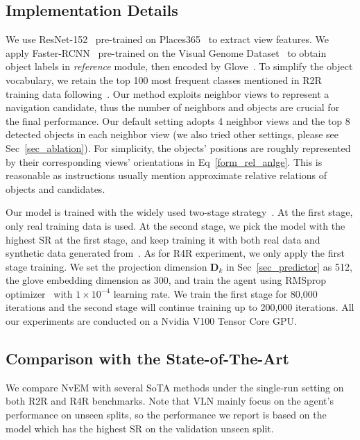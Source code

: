 \documentclass[sigconf]{acmart}
\begin{document}
\subsection{Implementation Details}
We use ResNet-152~\cite{he2016resnet} pre-trained on Places365~\cite{zhou2018places} to extract view features. 
We apply Faster-RCNN~\cite{ren2015faster-rcnn} pre-trained on the Visual Genome Dataset~\cite{ranjay2017genome} to obtain object labels in \textit{reference} module, then encoded by Glove~\cite{jeffrey2014glove}. 
To simplify the object vocabulary, we retain the top 100 most frequent classes mentioned in R2R training data following~\cite{hong2020relgraph}. 
Our method exploits neighbor views to represent a navigation candidate, thus the number of neighbors and objects are crucial for the final performance. 
Our default setting adopts 4 neighbor views and the top 8 detected objects in each neighbor view (we also tried other settings, please see Sec~\ref{sec_ablation}).
For simplicity, the objects' positions are roughly represented by their corresponding views' orientations in Eq~\eqref{form_rel_anlge}. This is reasonable as instructions usually mention approximate relative relations of objects and candidates. 

Our model is trained with the widely used two-stage strategy~\cite{tan2019envdrop}. At the first stage, only real training data is used.
At the second stage, we pick the model with the highest SR at the first stage, and keep training it with both real data and synthetic data generated from~\cite{fried2018speaker}.
As for R4R experiment, we only apply the first stage training. We set the projection dimension $\mathbf{D}_k$ in Sec~\ref{sec_predictor} as 512, the glove embedding dimension as 300, and train the agent using RMSprop optimizer~\cite{ruder2016optim} with $1\times 10^{-4}$ learning rate. 
We train the first stage for 80,000 iterations and the second stage will continue training up to 200,000 iterations. All our experiments are conducted on a Nvidia V100 Tensor Core GPU.


\subsection{Comparison with the State-of-The-Art}
We compare NvEM with several SoTA methods under the single-run setting on both R2R and R4R benchmarks. 
Note that VLN mainly focus on the agent's performance on unseen splits, so the performance we report is based on the model which has the highest {SR} on the validation unseen split.
\end{document}
